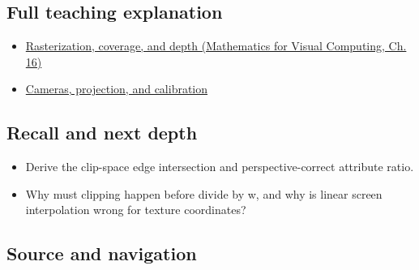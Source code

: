 \subsection{Full teaching explanation}\label{appendix-40426e4b2103-full-teaching-explanation}

\hypertarget{appendix-40426e4b2103-full-teaching-explanation}{}

\begin{itemize}
\tightlist
\item
  \href{../02-Mathematics-for-Visual-Computing/main.pdf\#nameddest=03-visual-computing-i-ch012-rasterization-coverage-and-depth}{Rasterization, coverage, and depth (Mathematics for Visual Computing, Ch. 16)}
\item
  \hyperref[03-visual-computing-i-ch003-cameras-projection-and-calibration]{Cameras, projection, and calibration}
\end{itemize}

\subsection{Recall and next depth}\label{appendix-40426e4b2103-recall-and-next-depth}

\hypertarget{appendix-40426e4b2103-recall-and-next-depth}{}

\begin{itemize}
\tightlist
\item
  Derive the clip-space edge intersection and perspective-correct attribute ratio.
\item
  Why must clipping happen before divide by w, and why is linear screen interpolation wrong for texture coordinates?
\end{itemize}

\subsection{Source and navigation}\label{appendix-40426e4b2103-source-and-navigation}

\hypertarget{appendix-40426e4b2103-source-and-navigation}{}

